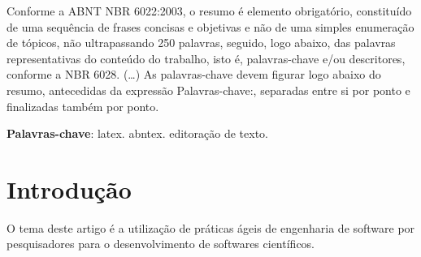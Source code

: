 \documentclass[
	article,			%
	11pt,				%
	oneside,			%
	a4paper,			%
	english,			%
	brazil,				%
	sumario=tradicional
	]{abntex2}
\begin{document}

\frenchspacing 


%
%
\maketitle

\begin{resumoumacoluna}
 Conforme a ABNT NBR 6022:2003, o resumo é elemento obrigatório, constituído de
 uma sequência de frases concisas e objetivas e não de uma simples enumeração
 de tópicos, não ultrapassando 250 palavras, seguido, logo abaixo, das palavras
 representativas do conteúdo do trabalho, isto é, palavras-chave e/ou
 descritores, conforme a NBR 6028. (\ldots) As palavras-chave devem figurar logo
 abaixo do resumo, antecedidas da expressão Palavras-chave:, separadas entre si por
 ponto e finalizadas também por ponto.
 
 \vspace{\onelineskip}
 
 \noindent
 \textbf{Palavras-chave}: latex. abntex. editoração de texto.
\end{resumoumacoluna}


\textual

\section*{Introdução}
O tema deste artigo é a utilização de práticas ágeis de engenharia de software por pesquisadores para o desenvolvimento de softwares científicos.
\end{document}
